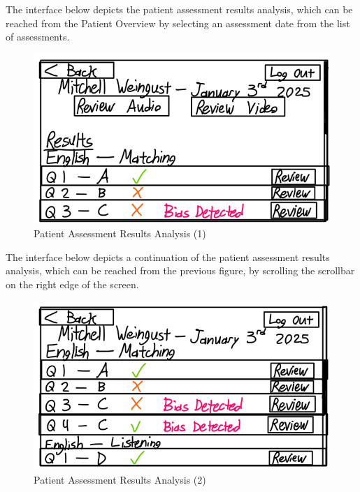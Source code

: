 \documentclass[12pt, titlepage]{article}
\begin{document}
\hspace{1.5em}The interface below depicts the patient assessment results analysis, which can be reached from the Patient Overview by selecting an assessment date from the list of assessments.
\begin{figure}[H]
  \centering
  \includegraphics[scale=0.9]{images/Patient-Assessment-Results-Analysis-1.png}
  \caption{Patient Assessment Results Analysis (1)}
\end{figure}

\hspace{1.5em}The interface below depicts a continuation of the patient assessment results analysis, which can be reached from the previous figure, by scrolling the scrollbar on the right edge of the screen.
\begin{figure}[H]
  \centering
  \includegraphics[scale=0.9]{images/Patient-Assessment-Results-Analysis-2.png}
  \caption{Patient Assessment Results Analysis (2)}
\end{figure}
\end{document}
